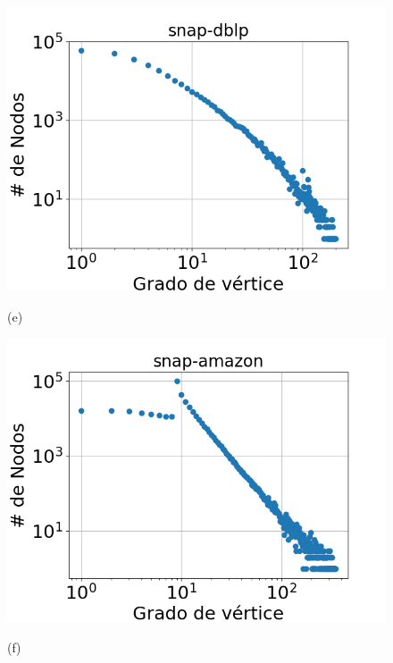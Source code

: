 \begin{figure}[p]
    	\begin{minipage}{1\textwidth}
    		\centering
    		\begin{minipage}{0.45\textwidth}
    			\centering
    			\includegraphics[width=1\linewidth]{img/grades/snap-dblp.png}
    			
    			(e)
    		\end{minipage}
    		\begin{minipage}{0.45\textwidth}
    			\centering
    			\includegraphics[width=1\linewidth]{img/grades/snap-amazon.png}
    			
    			(f)
    		\end{minipage}  
    	\end{minipage}
    	

\end{figure}

